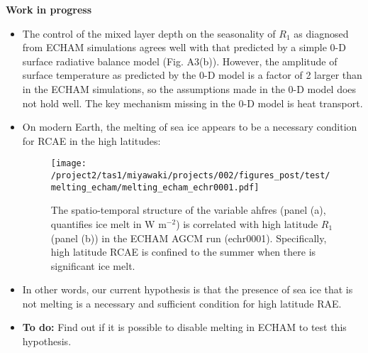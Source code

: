\documentclass{article}
\begin{document}
\textbf{Work in progress}
\begin{itemize}
  \item The control of the mixed layer depth on the seasonality of $R_{1}$ as diagnosed from ECHAM simulations agrees well with that predicted by a simple 0-D surface radiative balance model (Fig. A3(b)). However, the amplitude of surface temperature as predicted by the 0-D model is a factor of 2 larger than in the ECHAM simulations, so the assumptions made in the 0-D model does not hold well. The key mechanism missing in the 0-D model is heat transport.
  \item On modern Earth, the melting of sea ice appears to be a necessary condition for RCAE in the high latitudes:
        \begin{figure}[H]
          \texttt{[image: /project2/tas1/miyawaki/projects/002/figures\_post/test/melting\_echam/melting\_echam\_echr0001.pdf]}
          \caption{The spatio-temporal structure of the variable ahfres (panel (a), quantifies ice melt in W m$^{-2}$) is correlated with high latitude $R_{1}$ (panel (b)) in the ECHAM AGCM run (echr0001). Specifically, high latitude RCAE is confined to the summer when there is significant ice melt.}
        \end{figure}
  \item In other words, our current hypothesis is that the presence of sea ice that is not melting is a necessary and sufficient condition for high latitude RAE.
  \item \textbf{To do:} Find out if it is possible to disable melting in ECHAM to test this hypothesis.
\end{itemize}
\end{document}
